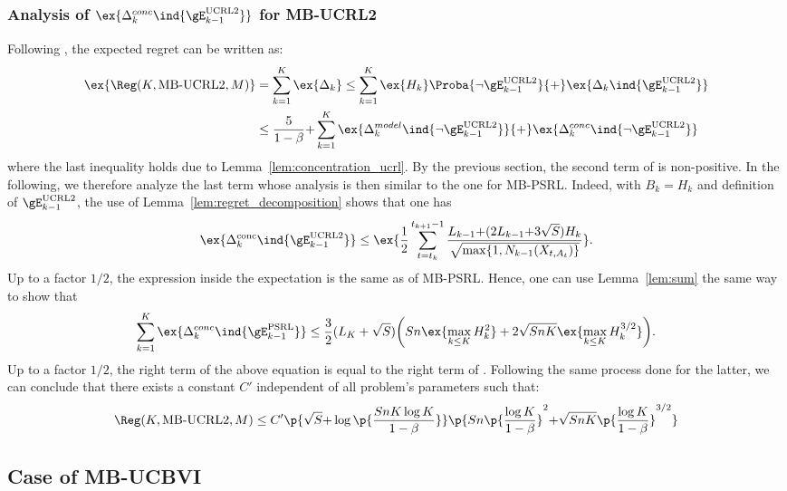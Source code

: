 \subsubsection{Analysis of $\ex{\Delta^{conc}_k\ind{\gE^\text{UCRL2}_{k-1}}}$ for MB-UCRL2}
Following , the expected regret can be written as:
\begin{align}
    \ex{\Reg(K,\text{MB-UCRL2},M)}
    &= \sum_{k=1}^K \ex{\Delta_k} \le \sum_{k=1}^{K}\ex{H_k}\Proba{\neg \gE^\text{UCRL2}_{k-1}} {+}\ex{\Delta_k \ind{\gE^\text{UCRL2}_{k-1}}} \nonumber \\
    &\le \frac{5}{1-\beta} {+} \sum_{k=1}^{K} \ex{\Delta^{model}_k\ind{\lnot\gE^\text{UCRL2}_{k-1}}} {+} \ex{\Delta^{conc}_k\ind{\lnot\gE^\text{UCRL2}_{k-1}}}
    \label{eq:proof_UCRL2_regret}
\end{align}
where the last inequality holds due to Lemma~\ref{lem:concentration_ucrl}.
By the previous section, the second term of  is non-positive.
In the following, we therefore analyze the last term whose analysis is then similar to the one for MB-PSRL.  Indeed, with $B_k=H_k$ and definition of $\gE_{k-1}^\text{UCRL2}$, the use of Lemma~\ref{lem:regret_decomposition} shows that one has
\begin{align*}
    \ex{\Delta^\text{conc}_k\ind{\gE_{k-1}^\text{UCRL2}}} \le \ex{\frac12 \sum_{t=t_k}^{t_{k+1}-1}\frac{L_{k-1} {+}(2L_{k-1} {+} 3\sqrt{S}) H_k}{\sqrt{\max\{1,N_{k-1}(X_{t,A_t})\} }}}.
\end{align*}
Up to a factor $1/2$, the expression inside the expectation is the same as  of MB-PSRL. Hence, one can use Lemma~\ref{lem:sum} the same way to show that
\begin{align*}
    \sum_{k=1}^{K} \ex{\Delta_k^{conc}\ind{\gE_{k-1}^\text{PSRL}}}
    \le \frac32(L_K+\sqrt{S})\bigg(Sn\ex{\max_{k\le K}H_k^2} +2\sqrt{SnK} \ex{\max_{k\le K}H_k^{3/2}}\bigg).
\end{align*}
Up to a factor $1/2$, the right term of the above equation is equal to the right term of . Following the same process done for the latter, we can conclude that there exists a constant $C'$ independent of all problem's parameters such that:
\begin{align*}
    \Reg(K,\text{MB-UCRL2},M) \le C'\p{\sqrt{S}{+}\log\p{\frac{SnK\log K}{1-\beta}}} \p{Sn\p{\frac{\log K}{1-\beta}}^{2}
    {+}\sqrt{SnK}\p{\frac{\log K}{1-\beta}}^{3/2} }
\end{align*}


\subsection{Case of MB-UCBVI}
\label{ssec:proof_UCBVI}

